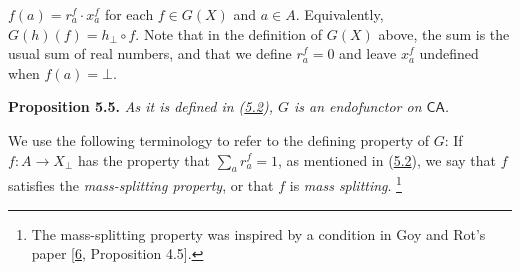 \hypertarget{html:S5.SS0.SSS0.Px1.p2.m3}{}\({f(a)=r_{a}^{f}\cdot x_{a}^{f}}\) for each %
\hypertarget{html:S5.SS0.SSS0.Px1.p2.m4}{}\({f\in G(X)}\) and %
\hypertarget{html:S5.SS0.SSS0.Px1.p2.m5}{}\({a\in A}\). Equivalently, %
\hypertarget{html:S5.SS0.SSS0.Px1.p2.m6}{}\({G(h)(f)=h_{\bot}\circ f}\). Note that in the definition of %
\hypertarget{html:S5.SS0.SSS0.Px1.p2.m7}{}\({G(X)}\) above, the sum is the usual sum of real numbers, and that we define %
\hypertarget{html:S5.SS0.SSS0.Px1.p2.m8}{}\({r_{a}^{f}=0}\) and leave %
\hypertarget{html:S5.SS0.SSS0.Px1.p2.m9}{}\({x_{a}^{f}}\) undefined when %
\hypertarget{html:S5.SS0.SSS0.Px1.p2.m10}{}\({f(a)=\bot}\).
\par\medskip
\hypertarget{html:S5.Thmtheorem5}{} \par\noindent\textbf{\textbf{Proposition 5.5}\textbf{.}}\quad  %
\hypertarget{html:S5.Thmtheorem5.p1}{} \emph{As it is defined in (\hyperlink{html:S5.E2}{5.2}), %
\hypertarget{html:S5.Thmtheorem5.p1.m1}{}\({G}\) is an endofunctor on %
\hypertarget{html:S5.Thmtheorem5.p1.m2}{}\({\mathsf{CA}}\).}
\par\medskip
\hypertarget{html:S5.SS0.SSS0.Px1.p3}{} We use the following terminology to refer to the defining property of %
\hypertarget{html:S5.SS0.SSS0.Px1.p3.m1}{}\({G}\): If %
\hypertarget{html:S5.SS0.SSS0.Px1.p3.m2}{}\({f:A\to X_{\bot}}\) has the property that %
\hypertarget{html:S5.SS0.SSS0.Px1.p3.m3}{}\({\sum_{a}r_{a}^{f}=1}\), as mentioned in (\hyperlink{html:S5.E2}{5.2}), we say that %
\hypertarget{html:S5.SS0.SSS0.Px1.p3.m4}{}\({f}\) satisfies the \emph{mass-splitting property}, or that %
\hypertarget{html:S5.SS0.SSS0.Px1.p3.m5}{}\({f}\) is \emph{mass splitting}.%
\hypertarget{html:footnote1}{}\footnote{The mass-splitting property was inspired by a condition in Goy and Rot’s paper [\hyperlink{html:bib.bib6}{6}, Proposition 4.5].}
\par\medskip
